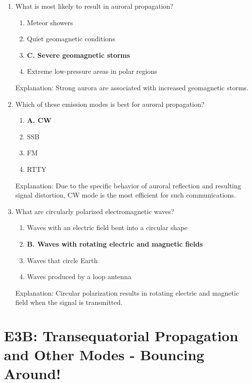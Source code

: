 \begin{enumerate}
    \item What is most likely to result in auroral propagation?
      \begin{enumerate}
        \item  Meteor showers
          \item  Quiet geomagnetic conditions
       \item \textbf{C. Severe geomagnetic storms}
        \item  Extreme low-pressure areas in polar regions
      \end{enumerate}
        \textcolor{myred}{Explanation:}
    Strong aurora are associated with increased geomagnetic storms.
   
        \item Which of these emission modes is best for auroral propagation?
        \begin{enumerate}
         \item \textbf{A. CW}
          \item  SSB
        \item  FM
         \item  RTTY
        \end{enumerate}
      \textcolor{myred}{Explanation:}
       Due to the specific behavior of auroral reflection and resulting signal distortion, CW mode is the most efficient for such communications.
       
        \item What are circularly polarized electromagnetic waves?
        \begin{enumerate}
       \item  Waves with an electric field bent into a circular shape
        \item \textbf{B. Waves with rotating electric and magnetic fields}
         \item  Waves that circle Earth
          \item  Waves produced by a loop antenna
        \end{enumerate}
       \textcolor{myred}{Explanation:}
    Circular polarization results in rotating electric and magnetic field when the signal is transmitted.

\end{enumerate}

\section{E3B: Transequatorial Propagation and Other Modes - Bouncing Around!}

